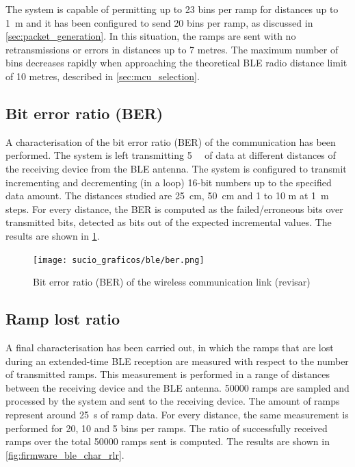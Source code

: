 The system is capable of permitting up to 23 bins per ramp for distances up to \SI{1}{\metre} and it has been configured to send 20 bins per ramp, as discussed in \cref{sec:packet_generation}. In this situation, the ramps are sent with no retransmissions or errors in distances up to 7 metres. The maximum number of bins decreases rapidly when approaching the theoretical BLE radio distance limit of 10 metres, described in \cref{sec:mcu_selection}.

\subsection{Bit error ratio (BER)}

A characterisation of the bit error ratio (BER) of the communication has been performed. The system is left transmitting \SI{5}{\mega\bit} of data at different distances of the receiving device from the BLE antenna. The system is configured to transmit incrementing and decrementing (in a loop) 16-bit numbers up to the specified data amount. The distances studied are \SI{25}{\centi\metre}, \SI{50}{\centi\metre} and 1 to 10 \si{\metre} at \SI{1}{\metre} steps. For every distance, the BER is computed as the failed/erroneous bits over transmitted bits, detected as bits out of the expected incremental values. The results are shown in \cref{fig:firmware_ble_char_ber}.

\begin{figure}[ht]
	\centering
	\texttt{[image: sucio\_graficos/ble/ber.png]}
	\caption{Bit error ratio (BER) of the wireless communication link (revisar)}
	\label{fig:firmware_ble_char_ber}
\end{figure}
\subsection{Ramp lost ratio}

A final characterisation has been carried out, in which the ramps that are lost during an extended-time BLE reception are measured with respect to the number of transmitted ramps. This measurement is performed in a range of distances between the receiving device and the BLE antenna. 50000 ramps are sampled and processed by the system and sent to the receiving device. The amount of ramps represent around \SI{25}{\second} of ramp data. For every distance, the same measurement is performed for 20, 10 and 5 bins per ramps. The ratio of successfully received ramps over the total 50000 ramps sent is computed. The results are shown in \cref{fig:firmware_ble_char_rlr}.

